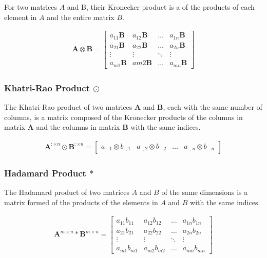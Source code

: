 \documentclass{article}
\begin{document}
For two matrices \(A\) and B, their Kronecker product is a of the products of each element in \(A\) and the entire matrix \(B\).

\begin{align*}
    \bm{A} \otimes \bm{B} = \begin{bmatrix}
    a_{11}\bm{B} & a_{12}\bm{B} & \dots & a_{1n}\bm{B} \\
    a_{21}\bm{B} & a_{22}\bm{B} & \dots & a_{2n}\bm{B} \\
    \vdots & \vdots & \ddots & \vdots \\
    a_{m1}\bm{B} & a{m2}\bm{B} & \dots & a_{mn}\bm{B} \end{bmatrix}
\end{align*}

\subsubsection{Khatri-Rao Product \(\odot\)}

The Khatri-Rao product of two matrices \(\bm{A}\) and \(\bm{B}\), each with the same number of columns, is a matrix composed of the Kronecker products of the columns in matrix \(\bm{A}\) and the columns in matrix \(\bm{B}\) with the same indices.

\begin{align*}
    \bm{A}^{:\times n} \odot \bm{B}^{:\times n} = \begin{bmatrix}
    a_{:,1} \otimes b_{:,1} & a_{:,2} \otimes b_{:,2} & \dots & a_{:,n} \otimes b_{:,n} \end{bmatrix}
\end{align*}

\subsubsection{Hadamard Product \(*\)}

The Hadamard product of two matrices \(A\) and \(B\) of the same dimensions is a matrix formed of the products of the elements in \(A\) and \(B\) with the same indices.

\begin{align*}
    \bm{A}^{m \times n} * \bm{B}^{m \times n} = \begin{bmatrix}
    a_{11}b_{11} & a_{12}b_{12} & \dots & a_{1n}b_{1n} \\
    a_{21}b_{21} & a_{22}b_{22} & \dots & a_{2n}b_{2n} \\
    \vdots & \vdots & \ddots & \vdots \\
    a_{m1}b_{m1} & a_{m2}b_{m2} & \dots & a_{mn}b_{mn} \end{bmatrix} 
\end{align*}
\end{document}
